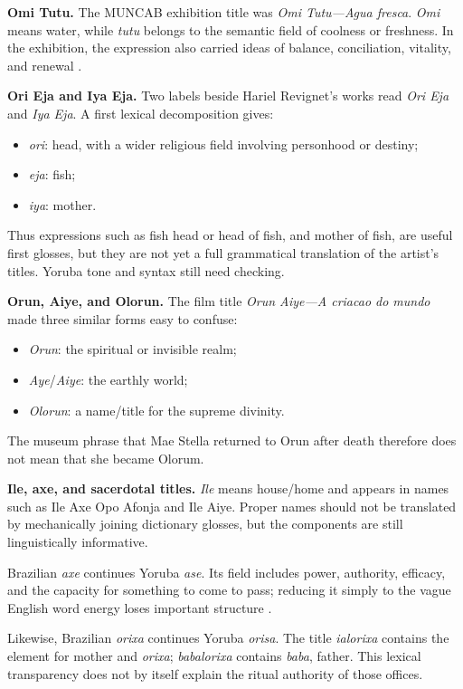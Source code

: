 \medskip\noindent
{\bf Omi Tutu.}
The MUNCAB exhibition title was \emph{Omi
Tutu---Agua fresca}.
\emph{Omi} means water, while \emph{tutu}
belongs to the semantic field of
coolness or freshness. In the exhibition, the
expression also carried ideas
of balance, conciliation, vitality, and
renewal \cite{muncab2026omitutu}.

\medskip\noindent
{\bf Ori Eja and Iya Eja.}
Two labels beside Hariel Revignet's works
read \emph{Ori Eja} and
\emph{Iya Eja}. A first lexical decomposition
gives:
\begin{itemize}
\item \emph{ori}: head, with a wider
      religious field involving personhood or
destiny;
\item \emph{eja}: fish;
\item \emph{iya}: mother.
\end{itemize}
Thus expressions such as fish head or head of
fish, and mother of fish, are
useful first glosses, but they are not yet a
full grammatical translation of
the artist's titles. Yoruba tone and syntax
still need checking.

\medskip\noindent
{\bf Orun, Aiye, and Olorun.}
The film title \emph{Orun Aiye---A criacao do
mundo} made three similar forms
easy to confuse:
\begin{itemize}
\item \emph{Orun}: the spiritual or invisible
      realm;
\item \emph{Aye}/\emph{Aiye}: the earthly
      world;
\item \emph{Olorun}: a name/title for the
      supreme divinity.
\end{itemize}
The museum phrase that Mae Stella returned to
Orun after death therefore does
not mean that she became Olorum.

\medskip\noindent
{\bf Ile, axe, and sacerdotal titles.}
\emph{Ile} means house/home and appears in
names such as Ile Axe Opo Afonja
and Ile Aiye. Proper names should not be
translated by mechanically joining
dictionary glosses, but the components are
still linguistically informative.

Brazilian \emph{axe} continues Yoruba
\emph{ase}. Its field includes power,
authority, efficacy, and the capacity for
something to come to pass; reducing
it simply to the vague English word energy
loses important structure
\cite{abiodun2014yoruba}.

Likewise, Brazilian \emph{orixa} continues
Yoruba \emph{orisa}. The title
\emph{ialorixa} contains the element for
mother and \emph{orixa};
\emph{babalorixa} contains \emph{baba},
father. This lexical transparency
does not by itself explain the ritual
authority of those offices.


